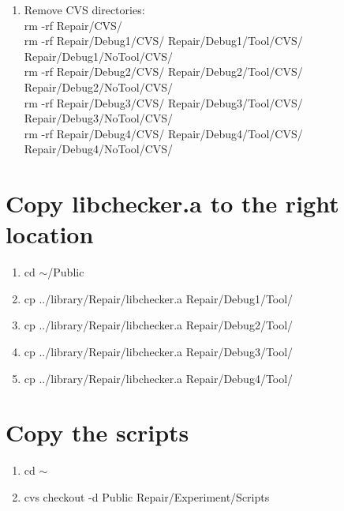 \documentclass{article}
\begin{document}
\begin{flushleft}
\begin{enumerate}
\item{Remove CVS directories:\\ 
      rm -rf Repair/CVS/\\
      rm -rf Repair/Debug1/CVS/ Repair/Debug1/Tool/CVS/ Repair/Debug1/NoTool/CVS/\\
      rm -rf Repair/Debug2/CVS/ Repair/Debug2/Tool/CVS/ Repair/Debug2/NoTool/CVS/\\
      rm -rf Repair/Debug3/CVS/ Repair/Debug3/Tool/CVS/ Repair/Debug3/NoTool/CVS/\\
      rm -rf Repair/Debug4/CVS/ Repair/Debug4/Tool/CVS/ Repair/Debug4/NoTool/CVS/}
\end{enumerate}


\section*{Copy libchecker.a to the right location}
\begin{enumerate}
\item{cd $\sim$/Public}
\item{cp ../library/Repair/libchecker.a Repair/Debug1/Tool/}
\item{cp ../library/Repair/libchecker.a Repair/Debug2/Tool/}
\item{cp ../library/Repair/libchecker.a Repair/Debug3/Tool/}
\item{cp ../library/Repair/libchecker.a Repair/Debug4/Tool/}
\end{enumerate}


\section*{Copy the scripts}
\begin{enumerate}
\item{cd $\sim$}
\item{cvs checkout -d Public Repair/Experiment/Scripts}
\end{enumerate}


\end{flushleft}
\end{document}
